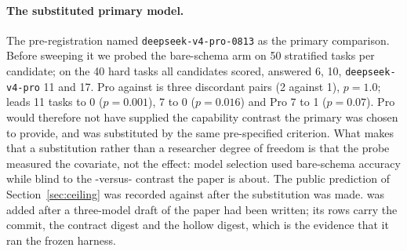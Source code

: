 \paragraph{The substituted primary model.} The pre-registration named
\texttt{deepseek-v4-pro-0813} as the primary comparison. Before sweeping it
we probed the bare-schema arm on 50 stratified tasks per candidate; on the
40 hard tasks all candidates scored, \mGLM{} answered 6, \mDS{} 10,
\texttt{deepseek-v4-pro} 11 and \mGPT{} 17. Pro against \mDS{} is three
discordant pairs (2 against 1), $p{=}1.0$; \mGPT{} leads \mGLM{} 11 tasks
to 0 ($p{=}0.001$), \mDS{} 7 to 0 ($p{=}0.016$) and Pro 7 to 1
($p{=}0.07$). Pro would therefore not have supplied the
capability contrast the primary was chosen to provide, and \mGPT{} was
substituted by the same pre-specified criterion. What makes that a
substitution rather than a researcher degree of freedom is that the probe
measured the covariate, not the effect: model selection used bare-schema
accuracy while blind to the \armC{}-versus-\armM{} contrast the paper is
about. The public prediction of Section~\ref{sec:ceiling} was recorded
against \mGPT{} after the substitution was made. \mSON{} was added after a
three-model draft of the paper had been written; its rows carry the
commit, the contract digest and the hollow digest, which is the evidence
that it ran the frozen harness.
